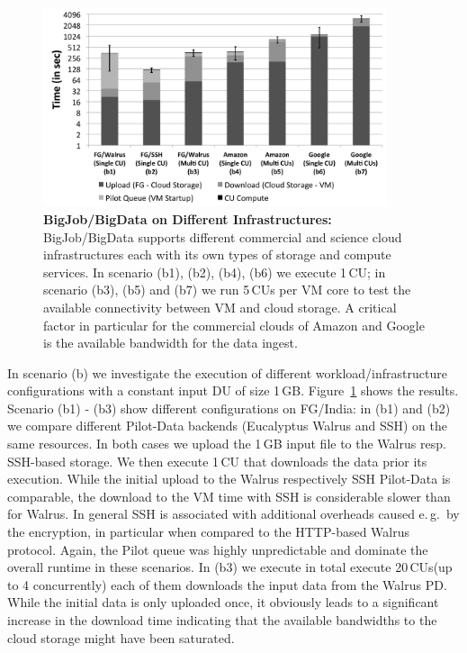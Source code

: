 \documentclass[times]{cpeauth}
\newcommand{\pilot}{Pilot\xspace}
\newcommand{\pilotdata}{Pilot-Data\xspace}
\newcommand{\pd}{PD\xspace}
\newcommand{\du}{DU\xspace}
\newcommand{\cu}{CU\xspace}
\newcommand{\cus}{CUs\xspace}
\begin{document}
\begin{figure}[ht]
	\centering
\centering
\includegraphics[width=0.9\textwidth]{performance/pd_google_aws.pdf}
\caption{\textbf{BigJob/BigData on Different Infrastructures:} BigJob/BigData
supports different commercial and science cloud infrastructures each with its
own types of storage and compute services. In scenario (b1), (b2), (b4), (b6)
we execute 1\,\cu; in scenario (b3), (b5) and (b7) we run 5\,\cus per VM core
to test the available connectivity between VM and cloud storage. A
critical factor in particular for the commercial clouds of Amazon and Google
is the available bandwidth for the data ingest. }
\label{fig:performance_pd_google_aws}
\end{figure}


In scenario (b) we investigate the execution of different
workload/infrastructure configurations with a constant input \du of size
1\,GB. Figure~\ref{fig:performance_pd_google_aws} shows the results. Scenario
(b1) - (b3) show different configurations on FG/India: in (b1) and (b2) we
compare different \pilotdata backends (Eucalyptus Walrus and SSH) on the same
resources. In both cases we upload the 1\,GB input file to the Walrus resp.
SSH-based storage. We then execute 1\,\cu that downloads the data prior its
execution. While the initial upload to the Walrus respectively SSH \pilotdata
is comparable, the download to the VM time with SSH is considerable slower
than for Walrus. In general SSH is associated with additional overheads caused
e.\,g.\ by the encryption, in particular when compared to the HTTP-based
Walrus protocol. Again, the \pilot queue was highly unpredictable and dominate
the overall runtime in these scenarios. In (b3) we execute in total execute 
20\,\cus (up to 4 concurrently) each of them downloads the input data from the 
Walrus \pd. While the initial data is only uploaded once, it obviously leads 
to a significant increase in the download time indicating that the available bandwidths to the cloud storage might have been saturated.
\end{document}

